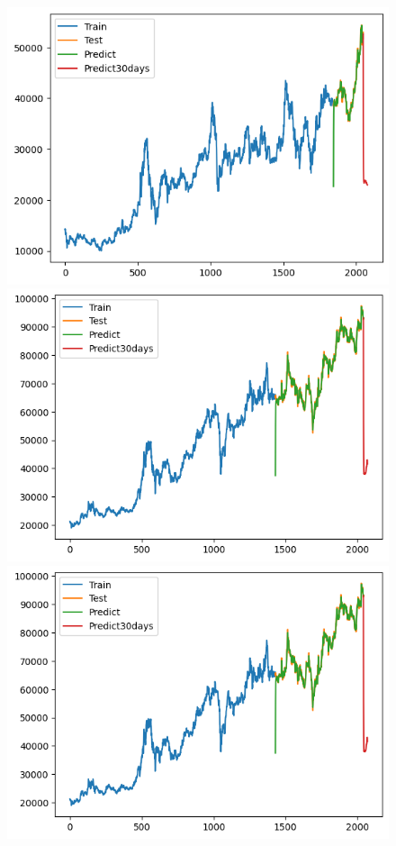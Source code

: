 \begin{figure}[H]
\begin{minipage}{0.15\textwidth}
    \centering
    \includegraphics[width=1\textwidth]{resources/chapter-5/result/KF_BIDV_9_1.png}
    \end{minipage}
    \hfill
    \begin{minipage}{0.15\textwidth}
    \centering
    \includegraphics[width=1\textwidth]{resources/chapter-5/result/KF_VCB_7_3.png}
    \end{minipage}
    \hfill
    \begin{minipage}{0.15\textwidth}
    \centering
    \includegraphics[width=1\textwidth]{resources/chapter-5/result/KF_VCB_7_3.png}

\end{minipage}
\end{figure}
